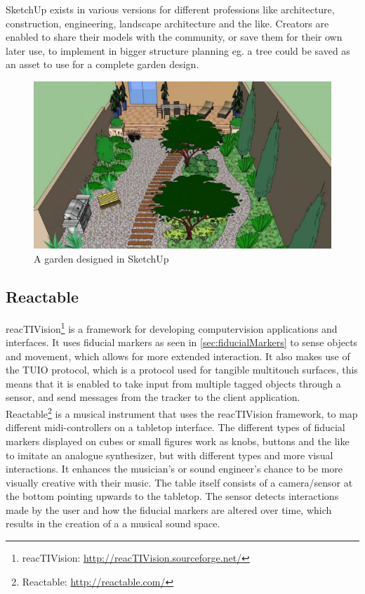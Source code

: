 			SketchUp exists in various versions for different professions like architecture, construction, engineering, landscape architecture and the like. Creators are enabled to share their models with the community, or save them for their own later use, to implement in bigger structure planning eg. a tree could be saved as an asset to use for a complete garden design.
			
			\begin{figure}[H]
				\centering
				\includegraphics[width=0.6\linewidth]{figure/Analysis/sketchupgarden}
				\caption{A garden designed in SketchUp}
				\label{fig:sketchupgarden}
			\end{figure}


		\subsection{Reactable}
			reacTIVision\footnote{reacTIVision: \url{http://reacTIVision.sourceforge.net/}} is a framework for developing computervision applications and interfaces. It uses fiducial markers as seen in  \autoref{sec:fiducialMarkers} to sense objects and movement, which allows for more extended interaction. It also makes use of the TUIO protocol, which is a protocol used for tangible multitouch surfaces, this means that it is enabled to take input from multiple tagged objects through a sensor, and send messages from the tracker to the client application. \\
			
			Reactable\footnote{Reactable: \url{http://reactable.com/}} is a musical instrument that uses the reacTIVision framework, to map different midi-controllers on a tabletop interface. The different types of fiducial markers displayed on cubes or small figures work as knobs, buttons and the like to imitate an analogue synthesizer, but with different types and more visual interactions. It enhances the musician's or sound engineer's chance to be more visually creative with their music. The table itself consists of a camera/sensor at the bottom pointing upwards to the tabletop. The sensor detects interactions made by the user and how the fiducial markers are altered over time, which results in the creation of a a musical sound space.
				
